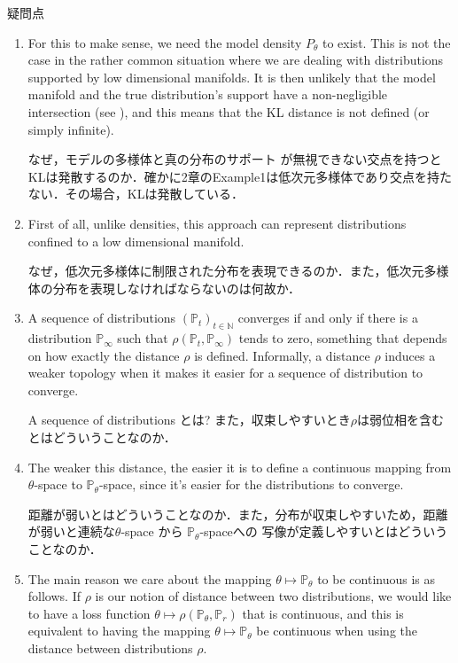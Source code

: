 \documentclass[uplatex, dvipdfmx]{jsarticle}
\theoremstyle{definition}
\begin{document}
    \begin{itembox}[l]{疑問点}
        \begin{enumerate}
            \item For this to make sense, we need the model density $P_{\theta}$
            to exist. This is not the case in the rather common situation where we are dealing with distributions supported 
            by low dimensional manifolds. It is then unlikely that the model manifold and the true distribution’s support have a non-negligible intersection 
            (see \cite{Martin}), and this means that the KL distance is not defined (or simply infinite). 
            
            なぜ，モデルの多様体と真の分布のサポート
            が無視できない交点を持つとKLは発散するのか．確かに2章のExample1は低次元多様体であり交点を持たない．その場合，KLは発散している．

            \item First of all, unlike densities, this approach can represent distributions confined to a low dimensional manifold.

            なぜ，低次元多様体に制限された分布を表現できるのか．また，低次元多様体の分布を表現しなければならないのは何故か．

            \item A sequence of distributions $(\mathbb{P}_{t})_{t \in \mathbb{N}}$ converges if and only if there is a distribution $\mathbb{P}_{\infty}$ 
            such that $\rho (\mathbb{P}_{t}, \mathbb{P}_{\infty})$ tends to zero, something that depends on how exactly the distance $\rho$ is defined. Informally, a distance 
            $\rho$ induces a weaker topology  when it makes it easier for a sequence of distribution to converge.
            
            A sequence of distributions とは? また，収束しやすいとき$\rho$は弱位相を含むとはどういうことなのか．

            \item The weaker this distance, the easier it is to define a continuous mapping from $\theta$-space to $\mathbb{P}_{\theta}$-space,
             since it’s easier for the distributions to converge.

            距離が弱いとはどういうことなのか．また，分布が収束しやすいため，距離が弱いと連続な$\theta$-space から $\mathbb{P}_{\theta}$-spaceへの
            写像が定義しやすいとはどういうことなのか．

            \item The main reason we care about the mapping $\theta  \longmapsto \mathbb{P}_{\theta}$ to be continuous is as follows. If 
            $\rho$ is our notion of distance between two distributions, we would like to have a loss function $\theta \longmapsto \rho (\mathbb{P}_{\theta}, \mathbb{P}_{r})$
            that is continuous, and this is equivalent to having the mapping $\theta \longmapsto \mathbb{P}_{\theta}$ 
            be continuous when using the distance between distributions $\rho$. 


\end{enumerate}
\end{itembox}
\end{document}
